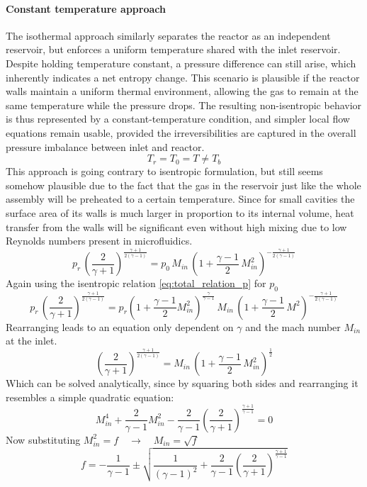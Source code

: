 \paragraph{Constant temperature approach}
	The isothermal approach similarly separates the reactor as an independent reservoir, but enforces a uniform temperature shared with the inlet reservoir.
	Despite holding temperature constant, a pressure difference can still arise, which inherently indicates a net entropy change.
	This scenario is plausible if the reactor walls maintain a uniform thermal environment, allowing the gas to remain at the same temperature while the pressure drops.
	The resulting non-isentropic behavior is thus represented by a constant-temperature condition, and simpler local flow equations remain usable, provided the irreversibilities are captured in the overall pressure imbalance between inlet and reactor. 
	$$
		T_r = T_0 = T \neq T_b
	$$
	This approach is going contrary to isentropic formulation, but still seems somehow plausible due to the fact that the gas in the reservoir just like the whole assembly will be preheated to a certain temperature.
	Since for small cavities the surface area of its walls is much larger in proportion to its internal volume, heat transfer from the walls will be significant even without high mixing due to low Reynolds numbers present in microfluidics.
	$$
		p_r\, \left(\frac{2}{\gamma+1}\right)^{\frac{\gamma+1}{2(\gamma-1)}}
		=  p_0\, M_{in}\,\left(1+\frac{\gamma-1}{2}\,M_{in}^2\right)^{-\frac{\gamma+1}{2(\gamma-1)}}
	$$
	Again using the isentropic relation \eqref{eq:total_relation_p} for $p_0$
	$$
		p_r\, \left(\frac{2}{\gamma+1}\right)^{\frac{\gamma+1}{2(\gamma-1)}}
		=  p_r \left(1 + \frac{\gamma - 1}{2}M_{in}^2 \right)^{\frac{\gamma}{\gamma - 1}}\, M_{in}\,\left(1+\frac{\gamma-1}{2}\,M^2\right)^{-\frac{\gamma+1}{2(\gamma-1)}}
	$$
	Rearranging leads to an equation only dependent on $\gamma$ and the mach number $M_{in}$ at the inlet.
	$$
		\left(\frac{2}{\gamma+1}\right)^{\frac{\gamma+1}{2(\gamma-1)}}
		=  M_{in}\,\left(1+\frac{\gamma-1}{2}\,M_{in}^2\right)^{\frac{1}{2}}
	$$
	Which can be solved analytically, since by squaring both sides and rearranging it resembles a simple quadratic equation:
	\begin{equation}
		M_{in}^4 + \frac{2}{\gamma - 1}M_{in}^2 - \frac{2}{\gamma -1}\left(\frac{2}{\gamma + 1}\right)^{\frac{\gamma + 1}{\gamma - 1}} = 0
	\end{equation}
	Now substituting $M_{in}^2 = f \quad \to \quad M_{in} = \sqrt{f}$
	\begin{equation}
		f = -\frac{1}{\gamma - 1} \pm \sqrt{\frac{1}{(\gamma - 1)^2}
		+ \frac{2}{\gamma -1}\left(\frac{2}{\gamma + 1}\right)^{\frac{\gamma + 1}{\gamma - 1}}}
	\end{equation}
